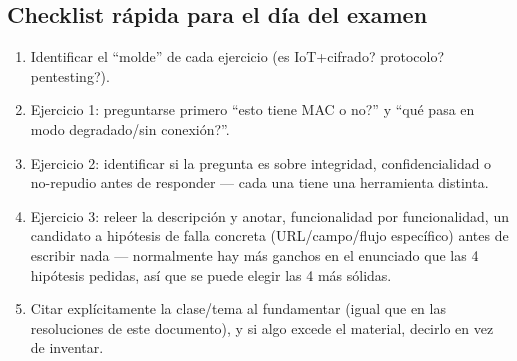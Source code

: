 \subsection{Checklist rápida para el día del examen}
\begin{enumerate}
  \item Identificar el ``molde'' de cada ejercicio (\textquestiondown{}es IoT+cifrado? \textquestiondown{}protocolo?
  \textquestiondown{}pentesting?).
  \item Ejercicio 1: preguntarse primero ``\textquestiondown{}esto tiene MAC o no?'' y ``\textquestiondown{}qué pasa en modo
  degradado/sin conexión?''.
  \item Ejercicio 2: identificar si la pregunta es sobre integridad, confidencialidad o
  no-repudio antes de responder --- cada una tiene una herramienta distinta.
  \item Ejercicio 3: releer la descripción y anotar, funcionalidad por funcionalidad, un
  candidato a hipótesis de falla concreta (URL/campo/flujo específico) antes de escribir
  nada --- normalmente hay más ganchos en el enunciado que las 4 hipótesis pedidas, así que
  se puede elegir las 4 más sólidas.
  \item Citar explícitamente la clase/tema al fundamentar (igual que en las resoluciones de
  este documento), y si algo excede el material, decirlo en vez de inventar.
\end{enumerate}
